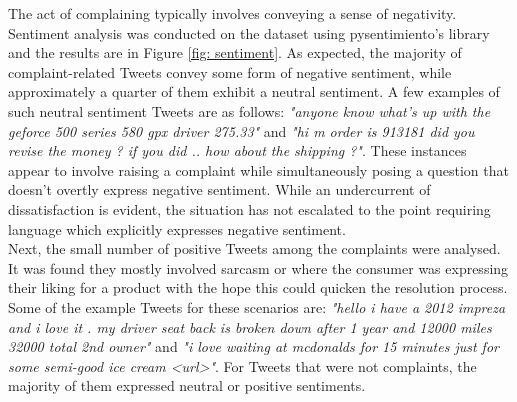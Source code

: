 The act of complaining typically involves conveying a sense of negativity. Sentiment analysis was conducted on the dataset using  pysentimiento's library \cite{perezPysentimientoPythonToolkit2021} and the results are in Figure \ref{fig: sentiment}. As expected, the majority of complaint-related Tweets convey some form of negative sentiment, while approximately a quarter of them exhibit a neutral sentiment. A few examples of such neutral sentiment Tweets are as follows: \textit{"anyone know what's up with the geforce 500 series 580 gpx driver 275.33"} and \textit{"hi m order is 913181 did you revise the money ? if you did .. how about the shipping ?"}. These instances appear to involve raising a complaint while simultaneously posing a question that doesn't overtly express negative sentiment. While an undercurrent of dissatisfaction is evident, the situation has not escalated to the point requiring language which explicitly expresses negative sentiment.\\

Next, the small number of positive Tweets among the complaints were analysed. It was found they mostly involved sarcasm or where the consumer was expressing their liking for a product with the hope this could quicken the resolution process. Some of the example Tweets for these scenarios are: \textit{"hello i have a 2012 impreza and i love it . my driver seat back is broken down after 1 year and 12000 miles 32000 total 2nd owner"} and \textit{"i love waiting at mcdonalds for 15 minutes just for some semi-good ice cream <url>"}. For Tweets that were not complaints, the majority of them expressed neutral or positive sentiments.


